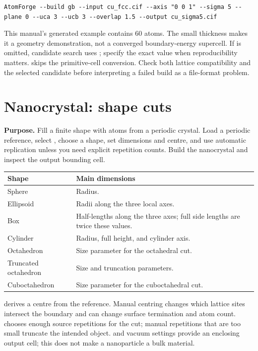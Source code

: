 \begin{lstlisting}
AtomForge --build gb --input cu_fcc.cif --axis "0 0 1" --sigma 5 --plane 0 --uca 3 --ucb 3 --overlap 1.5 --output cu_sigma5.cif
\end{lstlisting}
This manual's generated example contains 60 atoms. The small thickness makes it a geometry demonstration, not a converged boundary-energy supercell. If  is omitted, candidate search uses ; specify the exact value when reproducibility matters.  skips the primitive-cell conversion. Check both lattice compatibility and the selected candidate before interpreting a failed build as a file-format problem.

\section{Nanocrystal: shape cuts}
\textbf{Purpose.} Fill a finite shape with atoms from a periodic crystal. Load a periodic reference, select , choose a shape, set dimensions and centre, and use automatic replication unless you need explicit repetition counts. Build the nanocrystal and inspect the output bounding cell.

\begin{longtable}{p{.29\linewidth}p{.62\linewidth}}
\toprule Shape & Main dimensions \\ \midrule\endhead
Sphere & Radius. \\
Ellipsoid & Radii along the three local axes. \\
Box & Half-lengths along the three axes; full side lengths are twice these values. \\
Cylinder & Radius, full height, and cylinder axis. \\
Octahedron & Size parameter for the octahedral cut. \\
Truncated octahedron & Size and truncation parameters. \\
Cuboctahedron & Size parameter for the cuboctahedral cut. \\
\bottomrule
\end{longtable}
 derives a centre from the reference. Manual centring changes which lattice sites intersect the boundary and can change surface termination and atom count.  chooses enough source repetitions for the cut; manual repetitions that are too small truncate the intended object.  and vacuum settings provide an enclosing output cell; this does not make a nanoparticle a bulk material.

